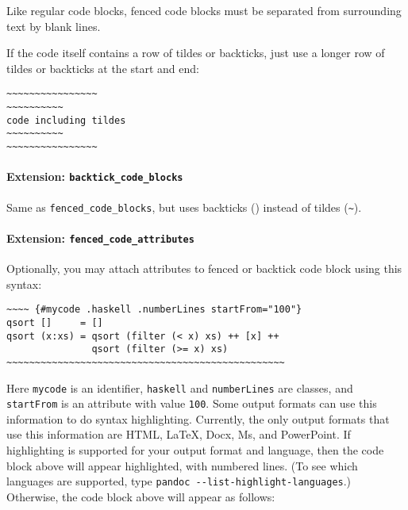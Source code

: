 Like regular code blocks, fenced code blocks must be separated from
surrounding text by blank lines.

If the code itself contains a row of tildes or backticks, just use a
longer row of tildes or backticks at the start and end:

\begin{verbatim}
~~~~~~~~~~~~~~~~
~~~~~~~~~~
code including tildes
~~~~~~~~~~
~~~~~~~~~~~~~~~~
\end{verbatim}

\hypertarget{extension-backtick_code_blocks}{%
\paragraph{\texorpdfstring{Extension:
\texttt{backtick\_code\_blocks}}{Extension: backtick\_code\_blocks}}\label{extension-backtick_code_blocks}}

Same as \texttt{fenced\_code\_blocks}, but uses backticks
(\texttt{\textasciigrave{}}) instead of tildes
(\texttt{\textasciitilde{}}).

\hypertarget{extension-fenced_code_attributes}{%
\paragraph{\texorpdfstring{Extension:
\texttt{fenced\_code\_attributes}}{Extension: fenced\_code\_attributes}}\label{extension-fenced_code_attributes}}

Optionally, you may attach attributes to fenced or backtick code block
using this syntax:

\begin{verbatim}
~~~~ {#mycode .haskell .numberLines startFrom="100"}
qsort []     = []
qsort (x:xs) = qsort (filter (< x) xs) ++ [x] ++
               qsort (filter (>= x) xs)
~~~~~~~~~~~~~~~~~~~~~~~~~~~~~~~~~~~~~~~~~~~~~~~~~
\end{verbatim}

Here \texttt{mycode} is an identifier, \texttt{haskell} and
\texttt{numberLines} are classes, and \texttt{startFrom} is an attribute
with value \texttt{100}. Some output formats can use this information to
do syntax highlighting. Currently, the only output formats that use this
information are HTML, LaTeX, Docx, Ms, and PowerPoint. If highlighting
is supported for your output format and language, then the code block
above will appear highlighted, with numbered lines. (To see which
languages are supported, type
\texttt{pandoc\ -\/-list-highlight-languages}.) Otherwise, the code
block above will appear as follows:

